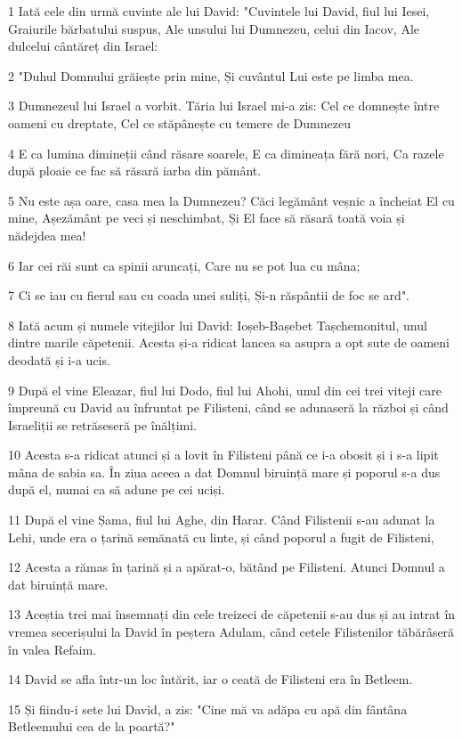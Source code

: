 \par 1 Iată cele din urmă cuvinte ale lui David: "Cuvintele lui David, fiul lui Iesei, Graiurile bărbatului suspus, Ale unsului lui Dumnezeu, celui din Iacov, Ale dulcelui cântăreț din Israel:
\par 2 "Duhul Domnului grăiește prin mine, Și cuvântul Lui este pe limba mea.
\par 3 Dumnezeul lui Israel a vorbit. Tăria lui Israel mi-a zis: Cel ce domnește între oameni cu dreptate, Cel ce stăpânește cu temere de Dumnezeu
\par 4 E ca lumina dimineții când răsare soarele, E ca dimineața fără nori, Ca razele după ploaie ce fac să răsară iarba din pământ.
\par 5 Nu este așa oare, casa mea la Dumnezeu? Căci legământ veșnic a încheiat El cu mine, Așezământ pe veci și neschimbat, Și El face să răsară toată voia și nădejdea mea!
\par 6 Iar cei răi sunt ca spinii aruncați, Care nu se pot lua cu mâna;
\par 7 Ci se iau cu fierul sau cu coada unei suliți, Și-n răspântii de foc se ard".
\par 8 Iată acum și numele vitejilor lui David: Ioșeb-Bașebet Tașchemonitul, unul dintre marile căpetenii. Acesta și-a ridicat lancea sa asupra a opt sute de oameni deodată și i-a ucis.
\par 9 După el vine Eleazar, fiul lui Dodo, fiul lui Ahohi, unul din cei trei viteji care împreună cu David au înfruntat pe Filisteni, când se adunaseră la război și când Israeliții se retrăseseră pe înălțimi.
\par 10 Acesta s-a ridicat atunci și a lovit în Filisteni până ce i-a obosit și i s-a lipit mâna de sabia sa. În ziua aceea a dat Domnul biruință mare și poporul s-a dus după el, numai ca să adune pe cei uciși.
\par 11 După el vine Șama, fiul lui Aghe, din Harar. Când Filistenii s-au adunat la Lehi, unde era o țarină semănată cu linte, și când poporul a fugit de Filisteni,
\par 12 Acesta a rămas în țarină și a apărat-o, bătând pe Filisteni. Atunci Domnul a dat biruință mare.
\par 13 Aceștia trei mai însemnați din cele treizeci de căpetenii s-au dus și au intrat în vremea secerișului la David în peștera Adulam, când cetele Filistenilor tăbărâseră în valea Refaim.
\par 14 David se afla într-un loc întărit, iar o ceată de Filisteni era în Betleem.
\par 15 Și fiindu-i sete lui David, a zis: "Cine mă va adăpa cu apă din fântâna Betleemului cea de la poartă?"
